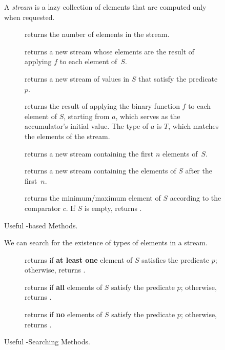 \begin{figure}[tp]
  \small
  \begin{tcolorbox}[title=Java Streams]
    A \emph{stream} is a lazy collection of elements that are computed only when requested.
    \vspace{2ex}
  \begin{description}
    \item [] returns the number of elements in the stream.
    \item [] returns a new stream whose elements are the result of applying $f$ to each element of~$S$.
    \item [] returns a new stream of values in $S$ that satisfy the predicate~$p$.
    \item [] returns the result of applying the binary function $f$ to each element of $S$, starting from $a$, which serves as the accumulator's initial value. The type of $a$ is $T$, which matches the elements of the stream.
    \item [] returns a new stream containing the first $n$ elements of~$S$.
    \item [] returns a new stream containing the elements of $S$ after the first~$n$.
    \item [] returns the minimum/maximum element of $S$ according to the comparator $c$. If $S$ is empty, returns .
  \end{description}
\end{tcolorbox}
  \caption{Useful -based Methods.}
  \label{fig:streams}
\end{figure}

\begin{figure}[tp]
  \small
  \begin{tcolorbox}[title=Java Stream--Searching Methods]
    We can search for the existence of types of elements in a stream.
    \vspace{2ex}
  \begin{description}
    \item [] returns  if \textbf{at least one} element of $S$ satisfies the predicate $p$; otherwise, returns .
    \item [] returns  if \textbf{all} elements of $S$ satisfy the predicate $p$; otherwise, returns .
    \item [] returns  if \textbf{no} elements of $S$ satisfy the predicate $p$; otherwise, returns .
  \end{description}
\end{tcolorbox}
  \caption{Useful -Searching Methods.}
  \label{fig:streams-searching}
\end{figure}

